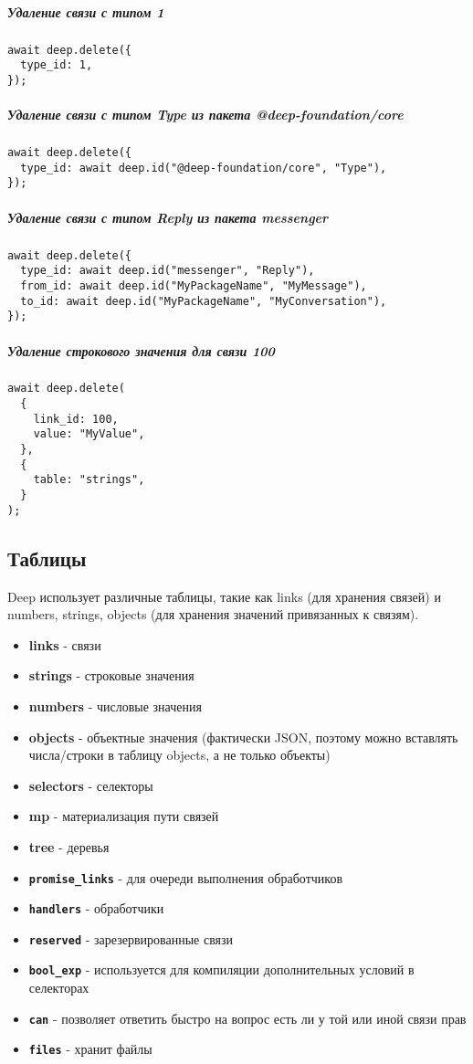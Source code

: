 \documentclass{article}
\begin{document}
\subparagraph{Удаление связи с типом 1}
\leavevmode
\begin{lstlisting}
await deep.delete({
  type_id: 1,
});
\end{lstlisting}

\subparagraph{Удаление связи с типом Type из пакета @deep-foundation/core}
\leavevmode
\begin{lstlisting}
await deep.delete({
  type_id: await deep.id("@deep-foundation/core", "Type"),
});
\end{lstlisting}

\subparagraph{Удаление связи с типом Reply из пакета messenger}
\leavevmode
\begin{lstlisting}
await deep.delete({
  type_id: await deep.id("messenger", "Reply"),
  from_id: await deep.id("MyPackageName", "MyMessage"),
  to_id: await deep.id("MyPackageName", "MyConversation"),
});
\end{lstlisting}

\subparagraph{Удаление строкового значения для связи 100}
\leavevmode
\begin{lstlisting}
await deep.delete(
  {
    link_id: 100,
    value: "MyValue",
  },
  {
    table: "strings",
  }
);
\end{lstlisting}

\subsection{Таблицы}
Deep использует различные таблицы, такие как links (для хранения связей) и
numbers, strings, objects (для хранения значений привязанных к связям).

\begin{itemize}
  \item \textbf{links} - связи
  \item \textbf{strings} - строковые значения
  \item \textbf{numbers} - числовые значения
  \item \textbf{objects} - объектные значения (фактически JSON, поэтому можно
        вставлять числа/строки в таблицу objects, а не только объекты)
  \item \textbf{selectors} - селекторы
  \item \textbf{mp} - материализация пути связей
  \item \textbf{tree} - деревья
  \item \textbf{\texttt{promise\_links}} - для очереди выполнения обработчиков
  \item \textbf{\texttt{handlers}} - обработчики
  \item \textbf{\texttt{reserved}} - зарезервированные связи
  \item \textbf{\texttt{bool\_exp}} - используется для компиляции
        дополнительных условий в селекторах
  \item \textbf{\texttt{can}} - позволяет ответить быстро на вопрос есть ли у
        той или иной связи прав
  \item \textbf{\texttt{files}} - хранит файлы
\end{itemize}
\end{document}
